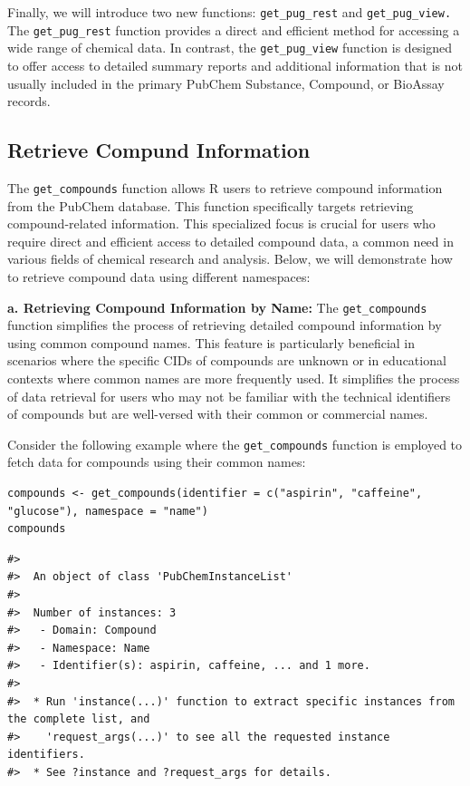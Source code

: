 Finally, we will introduce two new functions: \texttt{get\_pug\_rest} and \texttt{get\_pug\_view.} The \texttt{get\_pug\_rest} function provides a direct and efficient method for accessing a wide range of chemical data. In contrast, the \texttt{get\_pug\_view} function is designed to offer access to detailed summary reports and additional information that is not usually included in the primary PubChem Substance, Compound, or BioAssay records.

\hypertarget{retrieve-compund-information}{%
\subsection{Retrieve Compund Information}\label{retrieve-compund-information}}

The \texttt{get\_compounds} function allows R users to retrieve compound information from the PubChem database. This function specifically targets retrieving compound-related information. This specialized focus is crucial for users who require direct and efficient access to detailed compound data, a common need in various fields of chemical research and analysis. Below, we will demonstrate how to retrieve compound data using different namespaces:

\textbf{a. Retrieving Compound Information by Name:} The \texttt{get\_compounds} function simplifies the process of retrieving detailed compound information by using common compound names. This feature is particularly beneficial in scenarios where the specific CIDs of compounds are unknown or in educational contexts where common names are more frequently used. It simplifies the process of data retrieval for users who may not be familiar with the technical identifiers of compounds but are well-versed with their common or commercial names.

Consider the following example where the \texttt{get\_compounds} function is employed to fetch data for compounds using their common names:

\begin{verbatim}
compounds <- get_compounds(identifier = c("aspirin", "caffeine", "glucose"), namespace = "name") 
compounds
\end{verbatim}

\begin{verbatim}
#> 
#>  An object of class 'PubChemInstanceList'
#> 
#>  Number of instances: 3
#>   - Domain: Compound
#>   - Namespace: Name
#>   - Identifier(s): aspirin, caffeine, ... and 1 more.
#> 
#>  * Run 'instance(...)' function to extract specific instances from the complete list, and
#>    'request_args(...)' to see all the requested instance identifiers.
#>  * See ?instance and ?request_args for details.
\end{verbatim}

